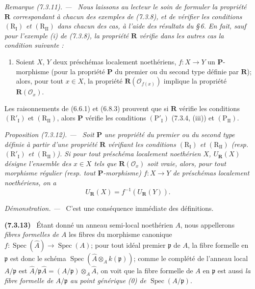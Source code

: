 \documentclass[10pt,oneside]{book}
\newenvironment{env}[1][]{\par\medskip\noindent\textbf{(#1)}\ }{\par}
\newenvironment{proposition}[1][]{%
  \par\medskip\noindent\itshape Proposition (#1). ---\ }{\par}
\newenvironment{remark}[1][]{%
  \par\medskip\noindent\itshape Remarque (#1). ---\ }{\par}
\newenvironment{proof}{%
  \par\medskip\noindent\textit{Démonstration. ---\ }}{\par}
\begin{document}
\begin{remark}[7.3.11]
\label{IV.2.s7.3.11-fr}
Nous laissons au lecteur le soin de formuler la propriété $\boldsymbol R$
correspondant à chacun des exemples de (7.3.8), et de vérifier les
conditions $(\mathrm R_{\mathrm I})$ et $(\mathrm R_{\mathrm{II}})$ dans
chacun des cas, à l'aide des résultats du \S\,6. En fait, sauf pour
l'exemple (i) de (7.3.8), la propriété $\boldsymbol R$ vérifie dans les
autres cas la condition suivante :
\begin{enumerate}
\item[$(\mathrm R'_{\mathrm I})$] Soient $X$, $Y$ deux préschémas
localement noethériens, $f:X\to Y$ un $\boldsymbol P$-morphisme (pour la
propriété $\boldsymbol P$ du premier ou du second type définie par
$\boldsymbol R$); alors, pour tout $x\in X$, la propriété
$\boldsymbol R(\mathscr O_{f(x)})$ implique la propriété
$\boldsymbol R(\mathscr O_x)$.
\end{enumerate}
Les raisonnements de (6.6.1) et (6.8.3) prouvent que si
$\boldsymbol R$ vérifie les conditions $(\mathrm R'_{\mathrm I})$ et
$(\mathrm R_{\mathrm{II}})$, alors $\boldsymbol P$ vérifie les conditions
$(\mathrm P'_{\mathrm I})$ (7.3.4, (iii)) et
$(\mathrm P_{\mathrm{II}})$.
\end{remark}

\begin{proposition}[7.3.12]
\label{IV.2.s7.3.12-fr}
Soit $\boldsymbol P$ une propriété du premier ou du second type définie à
partir d'une propriété $\boldsymbol R$ vérifiant les conditions
$(\mathrm R_{\mathrm I})$ et $(\mathrm R_{\mathrm{II}})$ (resp.
$(\mathrm R'_{\mathrm I})$ et $(\mathrm R_{\mathrm{II}})$). Si pour tout
préschéma localement noethérien $X$, $U_{\boldsymbol R}(X)$ désigne
l'ensemble des $x\in X$ tels que $\boldsymbol R(\mathscr O_x)$ soit vraie,
alors, pour tout morphisme régulier (resp. tout
$\boldsymbol P$-morphisme) $f:X\to Y$ de préschémas localement
noethériens, on a
\begin{equation}
U_{\boldsymbol R}(X)=f^{-1}(U_{\boldsymbol R}(Y)).
\tag{7.3.12.1}
\label{IV.2.eq.7.3.12.1-fr}
\end{equation}
\end{proposition}

\begin{proof}
C'est une conséquence immédiate des définitions.
\end{proof}

\begin{env}[7.3.13]
\label{IV.2.s7.3.13-fr}
Étant donné un anneau semi-local noethérien $A$, nous appellerons
\emph{fibres formelles de $A$} les fibres du morphisme canonique
$f:\operatorname{Spec}(\widehat A)\to\operatorname{Spec}(A)$; pour tout
idéal premier $\mathfrak p$ de $A$, la fibre formelle en $\mathfrak p$ est
donc le schéma
$\operatorname{Spec}(\widehat A\otimes_A k(\mathfrak p))$; comme le
complété de l'anneau local $A/\mathfrak p$ est
$\widehat A/\mathfrak p\widehat A=(A/\mathfrak p)\otimes_A\widehat A$, on
voit que la fibre formelle de $A$ en $\mathfrak p$ est aussi \emph{la
fibre formelle de $A/\mathfrak p$ au point générique (0) de
$\operatorname{Spec}(A/\mathfrak p)$}.
\end{env}
\end{document}
